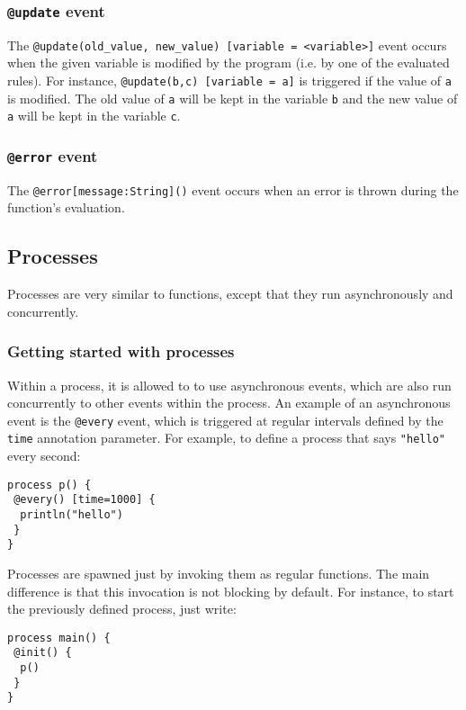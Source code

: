 \documentclass[11pt]{article}
\begin{document}
\subsubsection{\texttt{@update} event}

The \texttt{@update(old\_value, new\_value) [variable = <variable>]} event occurs when the given variable is modified by the program (i.e. by one of the evaluated rules). For instance, \texttt{@update(b,c) [variable = a]} is triggered if the value of \texttt{a} is modified. The old value of \texttt{a} will be kept in the variable \texttt{b} and the new value of \texttt{a} will be kept in the variable \texttt{c}.

\subsubsection{\texttt{@error} event}

The \texttt{@error[message:String]()} event occurs when an error is thrown during the function's evaluation.

\subsection{Processes\label{sec:processes}}

Processes are very similar to functions, except that they run asynchronously and concurrently. 

\subsubsection{Getting started with processes}


Within a process, it is allowed to to use asynchronous events, which are also run concurrently to other events within the process. An example of an asynchronous event is the \texttt{@every} event, which is triggered at regular intervals defined by the \texttt{time} annotation parameter. For example, to define a process that says \texttt{"hello"} every second:

\begin{lstlisting}
process p() {
 @every() [time=1000] {
  println("hello")
 }
}
\end{lstlisting}

Processes are spawned just by invoking them as regular functions. The main difference is that this invocation is not blocking by default. For instance, to start the previously defined process, just write:

\begin{lstlisting}
process main() {
 @init() {
  p()
 }
}
\end{lstlisting}
\end{document}
